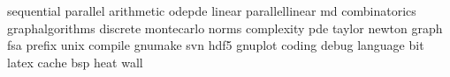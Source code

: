 sequential
parallel
arithmetic
odepde
linear
parallellinear
md
combinatorics
graphalgorithms
discrete
montecarlo
norms
complexity
pde
taylor
newton
graph
fsa
prefix
unix
compile
gnumake
svn
hdf5
gnuplot
coding
debug
language
bit
latex
cache
bsp
heat
wall
